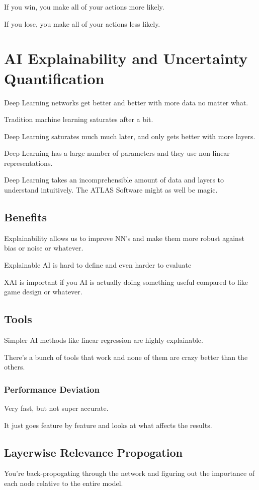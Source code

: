 \documentclass[fleqn]{report}
\begin{document}
If you win, you make all of your actions more likely. 

If you lose, you make all of your actions less likely. 

\chapter{AI Explainability and Uncertainty Quantification}
Deep Learning networks get better and better with more data no matter what. 

Tradition machine learning saturates after a bit. 

Deep Learning saturates much much later, and only gets better with more layers. 

Deep Learning has a large number of parameters and they use 
non-linear representations. 

Deep Learning takes an incomprehensible amount of data and layers to understand 
intuitively. The ATLAS Software might as well be magic. 

\section{Benefits}
Explainability allows us to improve NN's and make them more robust 
against bias or noise or whatever. 

Explainable AI is hard to define and even harder to evaluate 

XAI is important if you AI is actually doing something useful compared 
to like game design or whatever. 

\section{Tools}
Simpler AI methods like linear regression are highly explainable. 

There's a bunch of tools that work and none of them are crazy better than the 
others. 

\subsection{Performance Deviation}
Very fast, but not super accurate. 

It just goes feature by feature and looks at what affects the results. 

\section{Layerwise Relevance Propogation}
You're back-propogating through the network and figuring out the importance 
of each node relative to the entire model. 
\end{document}
